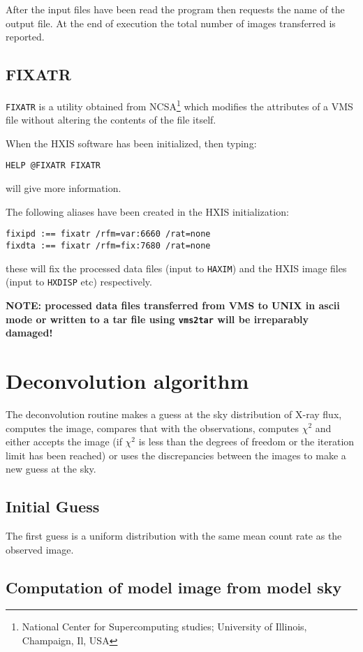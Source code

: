 After the input files have been read the program then requests the name
of the output file. At the end of execution the total number of images
transferred is reported.

\subsection{FIXATR}
\label{FIXATR}

\verb!FIXATR! is a utility obtained from NCSA\footnote{National Center
for Supercomputing studies; University of Illinois, Champaign, Il, USA}
which modifies the attributes of a VMS file without altering the
contents of the file itself.

When the HXIS software has been initialized, then typing:
\begin{verbatim}
HELP @FIXATR FIXATR
\end{verbatim}
will give more information.

The following aliases have been created in the HXIS initialization:
\begin{verbatim}
fixipd :== fixatr /rfm=var:6660 /rat=none 
fixdta :== fixatr /rfm=fix:7680 /rat=none
\end{verbatim}
these will fix the processed data files (input to \verb!HAXIM!) and the
HXIS image files (input to \verb!HXDISP! etc) respectively.

{\large \bf NOTE: processed data files transferred from VMS to UNIX in
ascii mode or written to a tar file using {\tt vms2tar} will be irreparably
damaged!}

\appendix
\section{Deconvolution algorithm}
\label{ALGO}
The deconvolution routine makes a guess at the sky distribution of
X-ray flux, computes the image, compares that with the observations,
computes $\chi^2$ and either accepts the image (if $\chi^2$ is less
than the degrees of freedom or the iteration limit has been reached) or
uses the discrepancies between the images to make a new guess at the
sky.

\subsection{Initial Guess}

The first guess is a uniform distribution
with the same mean count rate as the observed image.

\subsection{Computation of model image from model sky}

